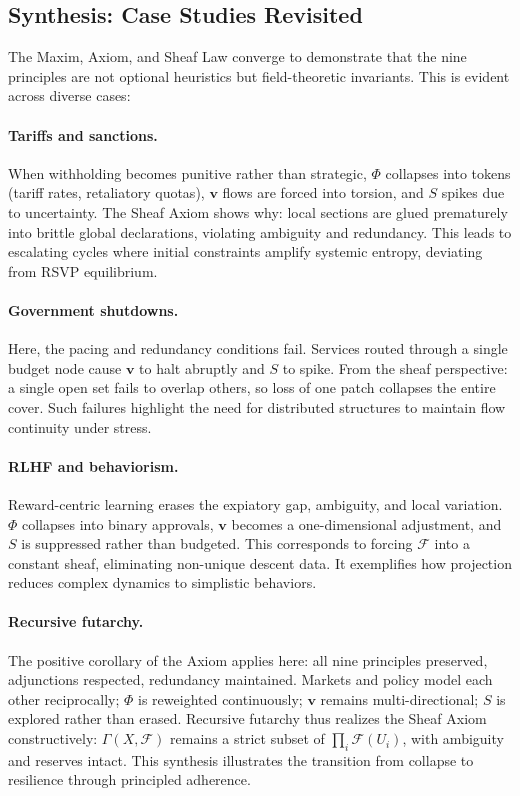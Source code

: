 \documentclass{article}
\begin{document}
\subsection*{Synthesis: Case Studies Revisited}
The Maxim, Axiom, and Sheaf Law converge to demonstrate that the nine 
principles are not optional heuristics but field-theoretic invariants. This is 
evident across diverse cases:

\paragraph{Tariffs and sanctions.}  
When withholding becomes punitive rather than strategic, $\Phi$ collapses into 
tokens (tariff rates, retaliatory quotas), $\mathbf{v}$ flows are forced into 
torsion, and $S$ spikes due to uncertainty. The Sheaf Axiom shows why: local 
sections are glued prematurely into brittle global declarations, violating 
ambiguity and redundancy. This leads to escalating cycles where initial constraints amplify systemic entropy, deviating from RSVP equilibrium.

\paragraph{Government shutdowns.}  
Here, the pacing and redundancy conditions fail. Services routed through a 
single budget node cause $\mathbf{v}$ to halt abruptly and $S$ to spike. 
From the sheaf perspective: a single open set fails to overlap others, so 
loss of one patch collapses the entire cover. Such failures highlight the need for distributed structures to maintain flow continuity under stress.

\paragraph{RLHF and behaviorism.}  
Reward-centric learning erases the expiatory gap, ambiguity, and local 
variation. $\Phi$ collapses into binary approvals, $\mathbf{v}$ becomes 
a one-dimensional adjustment, and $S$ is suppressed rather than budgeted. 
This corresponds to forcing $\mathcal{F}$ into a constant sheaf, eliminating 
non-unique descent data. It exemplifies how projection reduces complex dynamics to simplistic behaviors.

\paragraph{Recursive futarchy.}  
The positive corollary of the Axiom applies here: all nine principles 
preserved, adjunctions respected, redundancy maintained. Markets and policy 
model each other reciprocally; $\Phi$ is reweighted continuously; $\mathbf{v}$ 
remains multi-directional; $S$ is explored rather than erased. Recursive 
futarchy thus realizes the Sheaf Axiom constructively: $\Gamma(X,\mathcal{F})$ 
remains a strict subset of $\prod_i \mathcal{F}(U_i)$, with ambiguity and 
reserves intact. This synthesis illustrates the transition from collapse to resilience through principled adherence.
\end{document}
